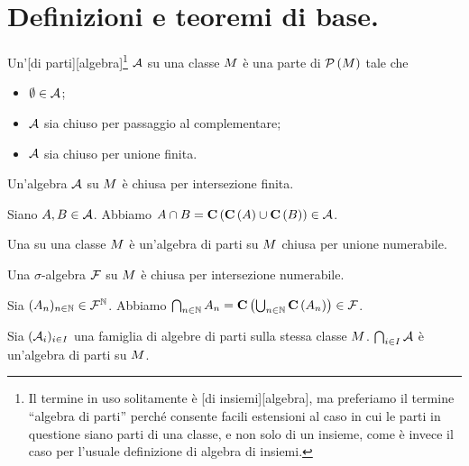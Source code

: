 \section{Definizioni e teoremi di base.}
\label{Misura_DefinizioniETeoremiDiBase}
\begin{Definition}
	Un'[di parti][algebra]\footnote{Il termine in uso
  solitamente \`e
  [di insiemi][algebra], ma preferiamo il termine
  ``algebra di parti'' perch\'e consente facili estensioni al caso in cui le
  parti in questione siano parti di una classe, e non solo di un insieme, come
  \`e invece il caso per l'usuale definizione di algebra di insiemi.}
  $\mathcal{A}$ su una classe $M$ \`e una parte di
  $\mathcal{P} \left (M \right )$ tale che
  \begin{itemize}
    \item $\emptyset \in \mathcal{A}$;
    \item $\mathcal{A}$ sia chiuso per passaggio al complementare;
    \item $\mathcal{A}$ sia chiuso per unione finita.
  \end{itemize}
\end{Definition}
\begin{Theorem}
  Un'algebra $\mathcal{A}$ su $M$ \`e chiusa per
  intersezione finita.
\end{Theorem}
\Proof Siano $A, B \in \mathcal{A}$.
Abbiamo
$A \cap B
= \mathbf{C} \left ( \mathbf{C} \left ( A \right ) \cup \mathbf{C} \left ( B \right ) \right )
\in \mathcal{A}$. \EndProof
\begin{Definition}
  Una
   su una classe $M$ \`e un'algebra
  di parti su $M$ chiusa per unione numerabile.
\end{Definition}
\begin{Theorem}
  Una $\sigma$-algebra $\mathcal{F}$ su $M$ \`e chiusa per
  intersezione numerabile.
\end{Theorem}
\Proof Sia
$(A_n)_{n \in \mathbb{N}} \in \mathcal{F}^\mathbb{N}$.
Abbiamo
$\bigcap_{n \in \mathbb{N}} A_n
= \mathbf{C} \left ( \bigcup_{n \in \mathbb{N}} \mathbf{C} \left ( A_n \right ) \right )
\in \mathcal{F}$. \EndProof
\begin{Theorem}
  Sia $(\mathcal{A}_i)_{i \in I}$ una famiglia di algebre di parti
  sulla stessa classe $M$.
  $\bigcap_{i \in I} \mathcal{A}$ \`e un'algebra di parti su
  $M$.
\end{Theorem}
